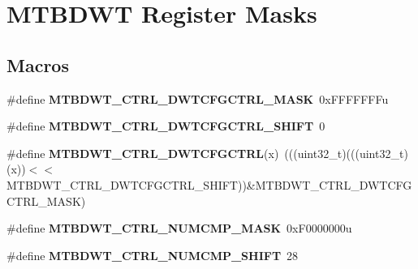 \hypertarget{group___m_t_b_d_w_t___register___masks}{}\section{M\+T\+B\+D\+WT Register Masks}
\label{group___m_t_b_d_w_t___register___masks}
\subsection*{Macros}
\begin{DoxyCompactItemize}
\item 
\mbox{\label{group___m_t_b_d_w_t___register___masks_ga9e40278e7b92b2e6b986112b6e2dddc3}} 
\#define {\bfseries M\+T\+B\+D\+W\+T\+\_\+\+C\+T\+R\+L\+\_\+\+D\+W\+T\+C\+F\+G\+C\+T\+R\+L\+\_\+\+M\+A\+SK}~0x\+F\+F\+F\+F\+F\+F\+Fu
\item 
\mbox{\label{group___m_t_b_d_w_t___register___masks_gad6dd05558d41419cb9f877533730598a}} 
\#define {\bfseries M\+T\+B\+D\+W\+T\+\_\+\+C\+T\+R\+L\+\_\+\+D\+W\+T\+C\+F\+G\+C\+T\+R\+L\+\_\+\+S\+H\+I\+FT}~0
\item 
\mbox{\label{group___m_t_b_d_w_t___register___masks_ga751a2e34d1e0f6ef6c755be288a29451}} 
\#define {\bfseries M\+T\+B\+D\+W\+T\+\_\+\+C\+T\+R\+L\+\_\+\+D\+W\+T\+C\+F\+G\+C\+T\+RL}(x)~(((uint32\+\_\+t)(((uint32\+\_\+t)(x))$<$$<$M\+T\+B\+D\+W\+T\+\_\+\+C\+T\+R\+L\+\_\+\+D\+W\+T\+C\+F\+G\+C\+T\+R\+L\+\_\+\+S\+H\+I\+FT))\&M\+T\+B\+D\+W\+T\+\_\+\+C\+T\+R\+L\+\_\+\+D\+W\+T\+C\+F\+G\+C\+T\+R\+L\+\_\+\+M\+A\+SK)
\item 
\mbox{\label{group___m_t_b_d_w_t___register___masks_ga846eb798600a6cbb83fb5343120b87e6}} 
\#define {\bfseries M\+T\+B\+D\+W\+T\+\_\+\+C\+T\+R\+L\+\_\+\+N\+U\+M\+C\+M\+P\+\_\+\+M\+A\+SK}~0x\+F0000000u
\item 
\mbox{\label{group___m_t_b_d_w_t___register___masks_ga8ae4e5abf11db57b34a826de0cd5e562}} 
\#define {\bfseries M\+T\+B\+D\+W\+T\+\_\+\+C\+T\+R\+L\+\_\+\+N\+U\+M\+C\+M\+P\+\_\+\+S\+H\+I\+FT}~28
\item 
\mbox{\label{group___m_t_b_d_w_t___register___masks_ga97447cbbfbb879c90c4072c4c4086254}} 
$$
\end{DoxyCompactItemize}
